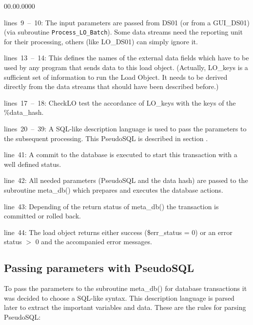 \begin{lyxlist}{00.00.0000}
\item [lines~9~--~10:]The input parameters are passed from DS01 (or
from a GUI\_DS01) (via subroutine \texttt{\scriptsize Process\_LO\_Batch}).
Some data streams need the reporting unit for their processing, others
(like LO\_DS01) can simply ignore it.
\item [lines~13~--~14:]This defines the names of the external data fields
which have to be used by any program that sends data to this load
object. (Actually, LO\_keys is a sufficient set of information to
run the Load Object. It needs to be derived directly from the data
streams that should have been described before.)
\item [lines~17~--~18:]CheckLO test the accordance of LO\_keys with
the keys of the \%data\_hash.
\item [lines~20~--~39:]A SQL-like description language is used to pass
the parameters to the subsequent processing. This PseudoSQL is described
in section .
\item [line~41:]A commit to the database is executed
to start this transaction with a well defined status.
\item [line~42:]All needed parameters (PseudoSQL and the data hash) are
passed to the subroutine meta\_db() which prepares and executes the
database actions.
\item [line~43:]Depending of the return status of meta\_db() the transaction
is committed or rolled back.
\item [line~44:]The load object returns either success (\$err\_status
= 0) or an error status $>$ 0 and the accompanied error messages.
\end{lyxlist}

\subsection{Passing parameters with PseudoSQL\label{section:PseudoSQL}}

To pass the parameters to the subroutine meta\_db() for database transactions
it was decided to choose a SQL-like syntax. This description language
is parsed later to extract the important variables and data. These
are the rules for parsing PseudoSQL: 

